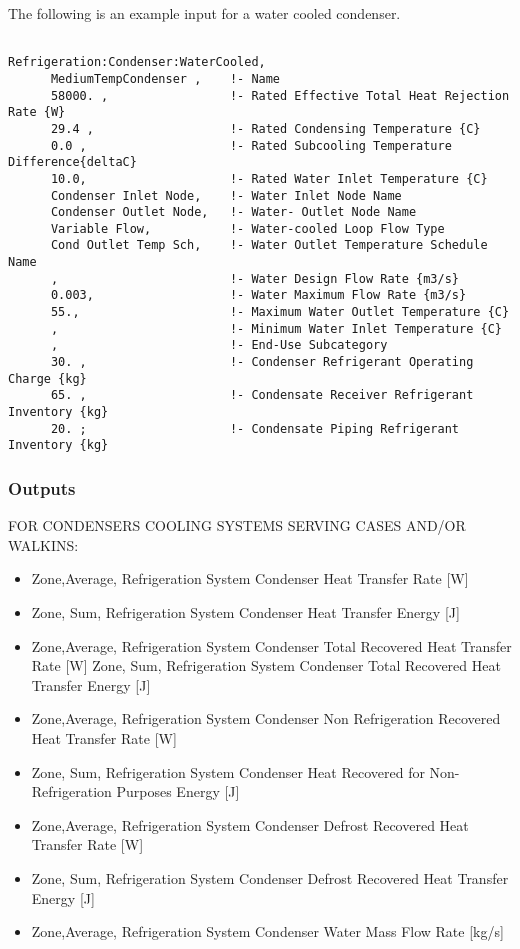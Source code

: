 The following is an example input for a water cooled condenser.

\begin{lstlisting}

Refrigeration:Condenser:WaterCooled,
      MediumTempCondenser ,    !- Name
      58000. ,                 !- Rated Effective Total Heat Rejection Rate {W}
      29.4 ,                   !- Rated Condensing Temperature {C}
      0.0 ,                    !- Rated Subcooling Temperature Difference{deltaC}
      10.0,                    !- Rated Water Inlet Temperature {C}
      Condenser Inlet Node,    !- Water Inlet Node Name
      Condenser Outlet Node,   !- Water- Outlet Node Name
      Variable Flow,           !- Water-cooled Loop Flow Type
      Cond Outlet Temp Sch,    !- Water Outlet Temperature Schedule Name
      ,                        !- Water Design Flow Rate {m3/s}
      0.003,                   !- Water Maximum Flow Rate {m3/s}
      55.,                     !- Maximum Water Outlet Temperature {C}
      ,                        !- Minimum Water Inlet Temperature {C}
      ,                        !- End-Use Subcategory
      30. ,                    !- Condenser Refrigerant Operating Charge {kg}
      65. ,                    !- Condensate Receiver Refrigerant Inventory {kg}
      20. ;                    !- Condensate Piping Refrigerant Inventory {kg}
\end{lstlisting}

\subsubsection{Outputs}\label{outputs-8-007}

FOR CONDENSERS COOLING SYSTEMS SERVING CASES AND/OR WALKINS:

\begin{itemize}
\item
  Zone,Average, Refrigeration System Condenser Heat Transfer Rate {[}W{]}
\item
  Zone, Sum, Refrigeration System Condenser Heat Transfer Energy {[}J{]}
\item
  Zone,Average, Refrigeration System Condenser Total Recovered Heat Transfer Rate {[}W{]} Zone, Sum, Refrigeration System Condenser Total Recovered Heat Transfer Energy {[}J{]}
\item
  Zone,Average, Refrigeration System Condenser Non Refrigeration Recovered Heat Transfer Rate {[}W{]}
\item
  Zone, Sum, Refrigeration System Condenser Heat Recovered for Non-Refrigeration Purposes Energy {[}J{]}
\item
  Zone,Average, Refrigeration System Condenser Defrost Recovered Heat Transfer Rate {[}W{]}
\item
  Zone, Sum, Refrigeration System Condenser Defrost Recovered Heat Transfer Energy {[}J{]}
\item
  Zone,Average, Refrigeration System Condenser Water Mass Flow Rate {[}kg/s{]}
\end{itemize}

